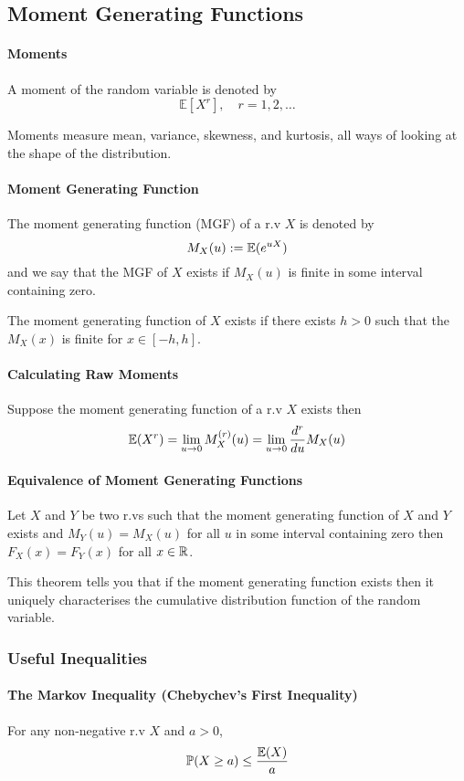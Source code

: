 \subsection{Moment Generating Functions}
\paragraph{Moments}
A moment of the random variable is denoted by
\[ \mathbb{E}[X^r], \quad r = 1, 2, \dots \]

Moments measure mean, variance, skewness, and kurtosis, all ways of looking at the shape of the distribution.

\paragraph{Moment Generating Function}
The moment generating function (MGF) of a r.v \(X\) is denoted by 
\[M_X(u) := \mathbb{E}(e^{uX})\]
and we say that the MGF of \(X\) exists if \(M_X(u)\) is finite in some interval containing zero.

The moment generating function of \(X\) exists if there exists \(h > 0\) such that the \(M_X(x)\) is finite for \(x \in [-h,h]\).

\paragraph{Calculating Raw Moments}
Suppose the moment generating function of a r.v \(X\) exists then 
\[\mathbb{E}(X^r) = \lim_{u \to 0} M_X^{(r)}(u) = \lim_{u \to 0} \frac{d^r}{du}M_X(u)\]

\paragraph{Equivalence of Moment Generating Functions}
Let \(X\) and \(Y\) be two r.vs such that the moment generating function of \(X\) and \(Y\) exists and \(M_Y(u) = M_X(u)\) for all \(u\) in some interval containing zero then \(F_X(x) = F_Y(x)\) for all \(x \in \mathbb{R}\).

This theorem tells you that if the moment generating function exists then it uniquely characterises the cumulative distribution function of the random variable.

\subsubsection{Useful Inequalities}
\paragraph{The Markov Inequality (Chebychev's First Inequality)}
For any non-negative r.v \(X\) and \(a > 0\),
\[\mathbb{P}(X \geq a) \leq \frac{\mathbb{E}(X)}{a}\]


